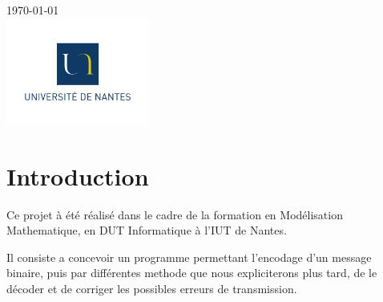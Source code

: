 \begin{titlepage}

{\large \today}\\[2cm] %



\includegraphics[width=4.7cm]{logo.jpg}\\%


\newpage %

\end{titlepage}

\renewcommand{\contentsname}{Sommaire}
\tableofcontents
\newpage

\section{Introduction}
\label{sec:introduction}

Ce projet à été réalisé dans le cadre de la formation en Modélisation Mathematique, en DUT Informatique à l'IUT de Nantes.

Il consiste a concevoir un programme permettant l'encodage d'un message binaire, puis par différentes methode que nous expliciterons plus tard, de le décoder et de corriger les possibles erreurs de transmission.


